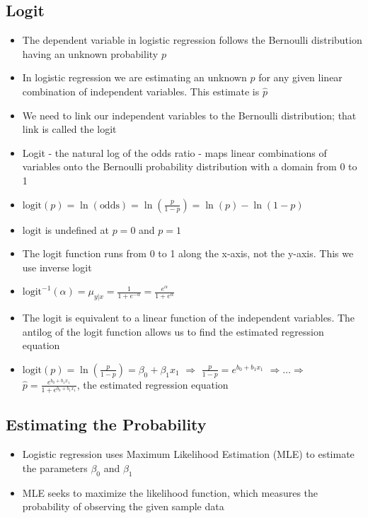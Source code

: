 \documentclass{article}
\begin{document}
\subsection{Logit}

\begin{itemize}
    \item The dependent variable in logistic regression follows the Bernoulli distribution having an unknown probability $p$
    \item In logistic regression we are estimating an unknown $p$ for any given linear combination of independent variables. This estimate is $\hat{p}$
    \item We need to link our independent variables to the Bernoulli distribution; that link is called the logit
    \item Logit - the natural log of the odds ratio - maps linear combinations of variables onto the Bernoulli probability distribution with a domain from 0 to 1
    \item $\text{logit}(p)=\ln(\text{odds})=\ln(\frac{p}{1-p})=\ln(p)-\ln(1-p)$
    \item $\text{logit}$ is undefined at $p=0$ and $p=1$
    \item The logit function runs from 0 to 1 along the x-axis, not the y-axis. This we use inverse logit
    \item $\text{logit}^{-1}(\alpha)=\mu_{y|x}=\frac{1}{1+e^{-\alpha}}=\frac{e^{\alpha}}{1+e^{\alpha}}$
    \item The logit is equivalent to a linear function of the independent variables. The antilog of the logit function allows us to find the estimated regression equation
    \item $\text{logit}(p)=\ln(\frac{p}{1-p})=\beta_0+\beta_1x_1$ $\Rightarrow$ $\frac{p}{1-p}=e^{b_0+b_1 x_1}$ $\Rightarrow \dots \Rightarrow$ $\hat{p}=\frac{e^{b_0+b_1 x_1}}{1 + e^{b_0+b_1 x_1}}$, the estimated regression equation
\end{itemize}

\subsection{Estimating the Probability}

\begin{itemize}
    \item Logistic regression uses Maximum Likelihood Estimation (MLE) to estimate the parameters $\beta_0$ and $\beta_1$
    \item MLE seeks to maximize the likelihood function, which measures the probability of observing the given sample data
\end{itemize}
\end{document}
